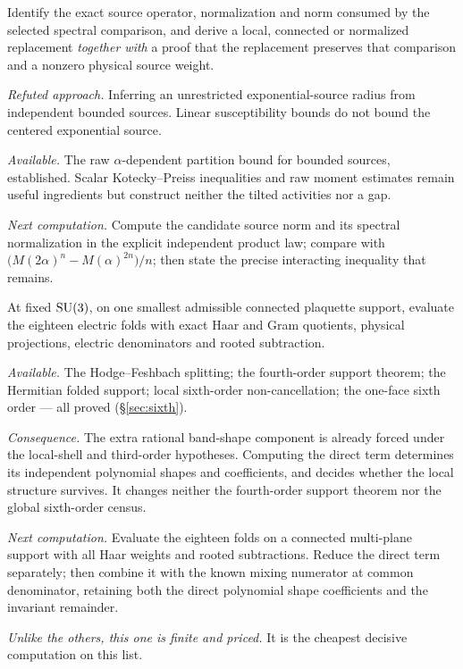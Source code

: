 \begin{problem}
\label{prob:g17}
Identify the exact source operator, normalization and norm consumed by
the selected spectral comparison, and derive a local, connected or
normalized replacement \emph{together with} a proof that the replacement
preserves that comparison and a nonzero physical source weight.

\emph{Refuted approach.} Inferring an unrestricted exponential-source
radius from independent bounded sources. Linear susceptibility bounds do
not bound the centered exponential source.

\emph{Available.} The raw $\alpha$-dependent partition bound for bounded
sources, established. Scalar Kotecky--Preiss inequalities and raw moment
estimates remain useful ingredients but construct neither the tilted
activities nor a gap.

\emph{Next computation.} Compute the candidate source norm and its
spectral normalization in the explicit independent product law; compare
with $\big(M(2\alpha)^n - M(\alpha)^{2n}\big)/n$; then state the precise
interacting inequality that remains.
\end{problem}

\begin{problem}
\label{prob:g9}
At fixed $\mathrm{SU}(3)$, on one smallest admissible connected plaquette
support, evaluate the eighteen electric folds with exact Haar and Gram
quotients, physical projections, electric denominators and rooted
subtraction.

\emph{Available.} The Hodge--Feshbach splitting; the fourth-order support
theorem; the Hermitian folded support; local sixth-order
non-cancellation; the one-face sixth order --- all proved
(\S\ref{sec:sixth}).

\emph{Consequence.} The extra rational band-shape component is already
forced under the local-shell and third-order hypotheses. Computing the
direct term determines its independent polynomial shapes and
coefficients, and decides whether the local structure survives. It
changes neither the fourth-order support theorem nor the global
sixth-order census.

\emph{Next computation.} Evaluate the eighteen folds on a connected
multi-plane support with all Haar weights and rooted subtractions. Reduce
the direct term separately; then combine it with the known mixing
numerator at common denominator, retaining both the direct polynomial
shape coefficients and the invariant remainder.

\emph{Unlike the others, this one is finite and priced.} It is the
cheapest decisive computation on this list.
\end{problem}

